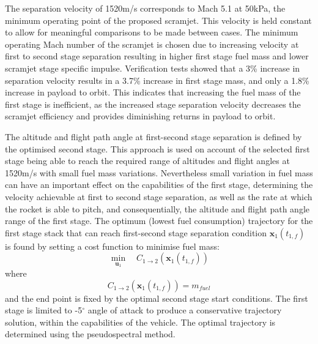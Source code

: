 \documentclass[]{aiaa-tc}
\begin{document}
The separation velocity of 1520m/s corresponds to Mach 5.1 at 50kPa, the minimum operating point of the proposed scramjet\cite{Preller2017}. This velocity is held constant to allow for meaningful comparisons to be made between cases.   The minimum operating Mach number of the scramjet is chosen due to increasing velocity at first to second stage separation resulting in higher first stage fuel mass and lower scramjet stage specific impulse. Verification tests showed that a 3\% increase in separation velocity results in a 3.7\% increase in first stage mass, and only a 1.8\% increase in payload to orbit. This indicates that increasing the fuel mass of the first stage is inefficient, as the increased stage separation velocity decreases the scramjet efficiency and provides diminishing returns in payload to orbit.  

The altitude and flight path angle at first-second stage separation is defined by the optimised second stage. This approach is used on account of the selected first stage being able to reach the required range of altitudes and flight angles at 1520m/s  with small fuel mass variations. 
Nevertheless small variation in fuel mass can have an important effect on the capabilities of the first stage, determining the velocity achievable at first to second stage separation, as well as the rate at which the rocket is able to pitch, and consequentially, the altitude and flight path angle range of the first stage.
 The optimum (lowest fuel consumption) trajectory for the first stage stack that can reach first-second stage separation condition $\textbf{x}_1(t_{1,f})$ is found by setting a cost function to minimise fuel mass:
\begin{equation}
\min\limits_{\textbf{u}_1} \quad  C_{1 \rightarrow 2}(\textbf{x}_1(t_{1,f}))
\end{equation}
where
\begin{equation}
C_{1 \rightarrow 2}(\textbf{x}_1(t_{1,f})) = m_{fuel}
\end{equation}
and the end point is fixed by the optimal second stage start conditions. The first stage is limited to -5$^\circ$ angle of attack to produce a conservative trajectory solution, within the capabilities of the vehicle. The optimal trajectory is determined using the pseudospectral method.
\end{document}
